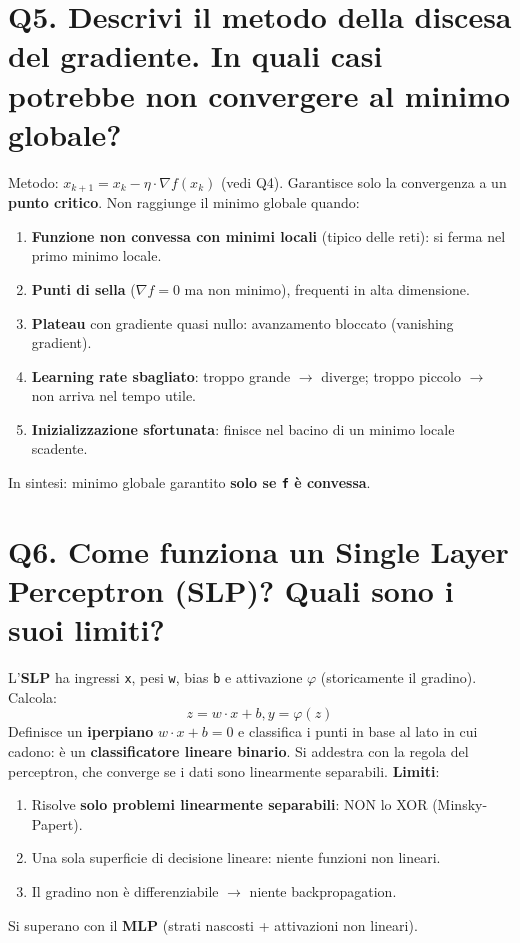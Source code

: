 \documentclass[11pt,a4paper]{article}
\begin{document}
\section*{Q5. Descrivi il metodo della discesa del gradiente. In quali casi potrebbe non convergere al minimo globale?}
Metodo: $x_{k+1} = x_{k} - \eta \cdot \nabla f(x_{k})$ (vedi Q4).
Garantisce solo la convergenza a un \textbf{punto critico}. Non raggiunge il minimo globale quando:
\begin{enumerate}
\item \textbf{Funzione non convessa con minimi locali} (tipico delle reti): si ferma nel primo minimo locale.
\item \textbf{Punti di sella} ($\nabla f=0$ ma non minimo), frequenti in alta dimensione.
\item \textbf{Plateau} con gradiente quasi nullo: avanzamento bloccato (vanishing gradient).
\item \textbf{Learning rate sbagliato}: troppo grande $\to $ diverge; troppo piccolo $\to $ non arriva nel tempo utile.
\item \textbf{Inizializzazione sfortunata}: finisce nel bacino di un minimo locale scadente.
\end{enumerate}
In sintesi: minimo globale garantito \textbf{solo se \texttt{f} è convessa}.
\newpage
\section*{Q6. Come funziona un Single Layer Perceptron (SLP)? Quali sono i suoi limiti?}
L'\textbf{SLP} ha ingressi \texttt{x}, pesi \texttt{w}, bias \texttt{b} e attivazione $\varphi $ (storicamente il gradino). Calcola:
\[ z = w \cdot  x + b,   y = \varphi (z) \]
Definisce un \textbf{iperpiano} $w\cdot x + b = 0$ e classifica i punti in base al lato in cui cadono: è un \textbf{classificatore lineare binario}. Si addestra con la regola del perceptron, che converge se i dati sono linearmente separabili.
\textbf{Limiti}:
\begin{enumerate}
\item Risolve \textbf{solo problemi linearmente separabili}: NON lo XOR (Minsky-Papert).
\item Una sola superficie di decisione lineare: niente funzioni non lineari.
\item Il gradino non è differenziabile $\to $ niente backpropagation.
\end{enumerate}
Si superano con il \textbf{MLP} (strati nascosti + attivazioni non lineari).
\newpage
\end{document}
